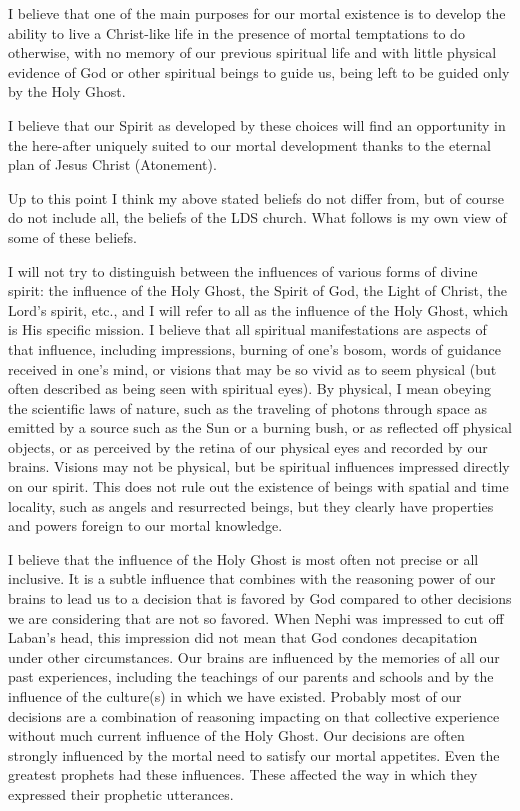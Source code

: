 			I believe that one of the main purposes for our mortal existence is to develop the ability to live a Christ-like life in the presence of mortal temptations to do otherwise, with no memory of our previous spiritual life and with little physical evidence of God or other spiritual beings to guide us, being left to be guided only by the Holy Ghost.

			I believe that our Spirit as developed by these choices will find an opportunity in the here-after uniquely suited to our mortal development thanks to the eternal plan of Jesus Christ (Atonement).

			Up to this point I think my above stated beliefs do not differ from, but of course do not include all, the beliefs of the LDS church. What follows is my own view of some of these beliefs. 

			I will not try to distinguish between the influences of various forms of divine spirit: the influence of the Holy Ghost, the Spirit of God, the Light of Christ, the Lord's spirit, etc., and I will refer to all as the influence of the Holy Ghost, which is His specific mission. I believe that all spiritual manifestations are aspects of that influence, including impressions, burning of one's bosom, words of guidance received in one's mind, or visions that may be so vivid as to seem physical (but often described as being seen with spiritual eyes). By physical, I mean obeying the scientific laws of nature, such as the traveling of photons through space as emitted by a source such as the Sun or a burning bush, or as reflected off physical objects, or as perceived by the retina of our physical eyes and recorded by our brains. Visions may not be physical, but be spiritual influences impressed directly on our spirit. This does not rule out the existence of beings with spatial and time locality, such as angels and resurrected beings, but they clearly have properties and powers foreign to our mortal knowledge.

			I believe that the influence of the Holy Ghost is most often not precise or all inclusive. It is a subtle influence that combines with the reasoning power of our brains to lead us to a decision that is favored by God compared to other decisions we are considering that are not so favored. When Nephi was impressed to cut off Laban's head, this impression did not mean that God condones decapitation under other circumstances. Our brains are influenced by the memories of all our past experiences, including the teachings of our parents and schools and by the influence of the culture(s) in which we have existed. Probably most of our decisions are a combination of reasoning impacting on that collective experience without much current influence of the Holy Ghost. Our decisions are often strongly influenced by the mortal need to satisfy our mortal appetites. Even the greatest prophets had these influences. These affected the way in which they expressed their prophetic utterances.

